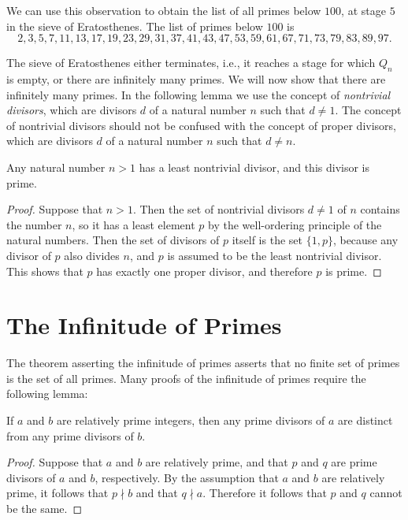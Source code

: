 We can use this observation to obtain the list of all primes below $100$, at stage $5$ in the sieve of Eratosthenes. The list of primes below $100$ is
\begin{equation*}
2,3,5,7,11,13,17,19,23,29,31,37,41,43,47,53,59,61,67,71,73,79,83,89,97.
\end{equation*}

The sieve of Eratosthenes either terminates, i.e., it reaches a stage for which $Q_n$ is empty, or there are infinitely many primes. We will now show that there are infinitely many primes. In the following lemma we use the concept of \emph{nontrivial divisors}, which are divisors $d$ of a natural number $n$ such that $d\neq 1$. The concept of nontrivial divisors should not be confused with the concept of proper divisors, which are divisors $d$ of a natural number $n$ such that $d\neq n$.

\begin{theorem}
  Any natural number $n>1$ has a least nontrivial divisor, and this divisor is prime.
\end{theorem}

\begin{proof}
  Suppose that $n>1$. Then the set of nontrivial divisors $d\neq 1$ of $n$ contains the number $n$, so it has a least element $p$ by the well-ordering principle of the natural numbers. Then the set of divisors of $p$ itself is the set $\{1,p\}$, because any divisor of $p$ also divides $n$, and $p$ is assumed to be the least nontrivial divisor. This shows that $p$ has exactly one proper divisor, and therefore $p$ is prime.
\end{proof}

\section{The Infinitude of Primes}

The theorem asserting the infinitude of primes asserts that no finite set of primes is the set of all primes. Many proofs of the infinitude of primes require the following lemma:

\begin{lemma}
  If $a$ and $b$ are relatively prime integers, then any prime divisors of $a$ are distinct from any prime divisors of $b$.
\end{lemma}

\begin{proof}
  Suppose that $a$ and $b$ are relatively prime, and that $p$ and $q$ are prime divisors of $a$ and $b$, respectively. By the assumption that $a$ and $b$ are relatively prime, it follows that $p\nmid b$ and that $q\nmid a$. Therefore it follows that $p$ and $q$ cannot be the same.
\end{proof}

